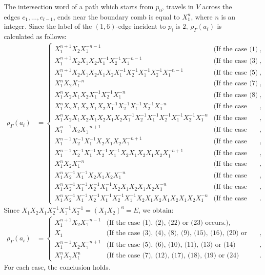 \documentclass{amsart}
\theoremstyle{plain}
\theoremstyle{definition}
\begin{document}
The intersection word of a path which starts from $p_0$, travels in $V$ across the edges $e_1,\ldots,e_{l-1}$, ends near the boundary comb is equal to $X_1^n$, where $n$ is an integer. 
Since the label of the $(1,6)$-edge incident to $p_i$ is $2$, $\rho_\Gamma(a_i)$ is calculated as follows: 
{\allowdisplaybreaks
\begin{align*}
\rho_\Gamma(a_i) & =\begin{cases}
X_1^{n+1}X_2X_1^{-n-1} & \text{(If the case (1) or (2) occurs.)}, \\
X_1^{n+1}X_2X_1X_2X_1^{-1}X_2^{-1}X_1^{-n-1} & \text{(If the case (3) or (4) occurs.)}, \\
X_1^{n+1}X_2X_1X_2X_1X_2X_1^{-1}X_2^{-1}X_1^{-1}X_2^{-1}X_1^{-n-1} & \text{(If the case (5) or (6) occurs.)}, \\
X_1^{n}X_2X_1^{-n} & \text{(If the case (7) occurs.)}, \\
X_1^{n}X_2X_1X_2X_1^{-1}X_2^{-1}X_1^{-n} & \text{(If the case (8) or (9) occurs.)}, \\
X_1^{n}X_2X_1X_2X_1X_2X_1^{-1}X_2^{-1}X_1^{-1}X_2^{-1}X_1^{-n} & \text{(If the case (10) or (11) occurs.)}, \\
X_1^{n}X_2X_1X_2X_1X_2X_1X_2X_1^{-1}X_2^{-1}X_1^{-1}X_2^{-1}X_1^{-1}X_2^{-1}X_1^{-n} & \text{(If the case (12) occurs.)}, \\
X_1^{n-1}X_2X_1^{-n+1} & \text{(If the case (13) or (14) occurs.)}, \\
X_1^{n-1}X_2^{-1}X_1^{-1}X_2X_1X_2X_1^{-n+1} & \text{(If the case (15) or (16) occurs.)}, \\
X_1^{n-1}X_2^{-1}X_1^{-1}X_2^{-1}X_1^{-1}X_2X_1X_2X_1X_2X_1^{-n+1} & \text{(If the case (17) or (18) occurs.)}, \\
X_1^{n}X_2X_1^{-n} & \text{(If the case (19) occurs.)}, \\
X_1^{n}X_2^{-1}X_1^{-1}X_2X_1X_2X_1^{-n} & \text{(If the case (20) or (21) occurs.)}, \\
X_1^{n}X_2^{-1}X_1^{-1}X_2^{-1}X_1^{-1}X_2X_1X_2X_1X_2X_1^{-n} & \text{(If the case (22) or (23) occurs.)}, \\
X_1^{n}X_2^{-1}X_1^{-1}X_2^{-1}X_1^{-1}X_2^{-1}X_1^{-1}X_2X_1X_2X_1X_2X_1X_2X_1^{-n} & \text{(If the case (24) occurs.)}. 
\end{cases}
\end{align*}
}
Since $X_1X_2X_1X_2^{-1}X_1^{-1}X_2^{-1}=(X_1X_2)^6=E$, we obtain: 
\begin{align*}
\rho_\Gamma(a_i) & =\begin{cases}
X_1^{n+1}X_2X_1^{-n-1} & \text{(If the case (1), (2), (22) or (23) occurs.)}, \\
X_1 & \text{(If the case (3), (4), (8), (9), (15), (16), (20) or (21) occurs.)}, \\ 
X_1^{n-1}X_2X_1^{-n+1} & \text{(If the case (5), (6), (10), (11), (13) or (14) occurs.)}, \\
X_1^{n}X_2X_1^{n} & \text{(If the case (7), (12), (17), (18), (19) or (24) occurs.)}. 
\end{cases}
\end{align*}
For each case, the conclusion holds. 
\end{document}
